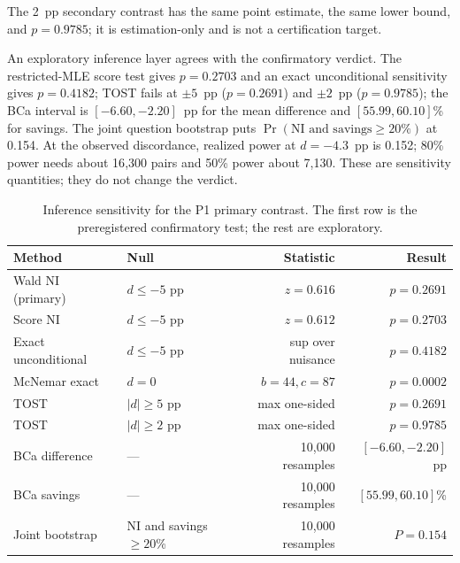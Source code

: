The 2~pp secondary contrast has the same point estimate, the same lower bound, and $p=0.9785$;
it is estimation-only and is not a certification target.

An exploratory inference layer agrees with the confirmatory verdict. The restricted-MLE score
test gives $p=0.2703$ and an exact unconditional sensitivity gives $p=0.4182$; TOST fails at
$\pm5$~pp ($p=0.2691$) and $\pm2$~pp ($p=0.9785$); the BCa
interval is $[-6.60,-2.20]$~pp for the mean difference and $[55.99,60.10]$\% for savings. The
joint question bootstrap puts $\Pr(\text{NI and savings}\ge20\%)$ at 0.154. At the observed
discordance, realized power at $d=-4.3$~pp is 0.152; 80\% power needs about 16{,}300 pairs and
50\% power about 7{,}130. These are sensitivity quantities; they do not change the verdict.

\begin{table}[pos=htbp]
  \centering
  \caption{Inference sensitivity for the P1 primary contrast. The first row is the preregistered confirmatory test; the rest are exploratory.}
  \label{tab:p1inference}
  \footnotesize
  \begin{tabular}{@{}llrr@{}}
    \toprule
    \textbf{Method} & \textbf{Null} & \textbf{Statistic} & \textbf{Result} \\
    \midrule
    Wald NI (primary) & $d\le-5$ pp & $z=0.616$ & $p=0.2691$ \\
    Score NI & $d\le-5$ pp & $z=0.612$ & $p=0.2703$ \\
    Exact unconditional & $d\le-5$ pp & sup over nuisance & $p=0.4182$ \\
    McNemar exact & $d=0$ & $b=44,c=87$ & $p=0.0002$ \\
    TOST & $|d|\ge5$ pp & max one-sided & $p=0.2691$ \\
    TOST & $|d|\ge2$ pp & max one-sided & $p=0.9785$ \\
    BCa difference & --- & 10{,}000 resamples & $[-6.60,-2.20]$ pp \\
    BCa savings & --- & 10{,}000 resamples & $[55.99,60.10]$\% \\
    Joint bootstrap & NI and savings $\ge20$\% & 10{,}000 resamples & $P=0.154$ \\
    \bottomrule
  \end{tabular}
\end{table}

